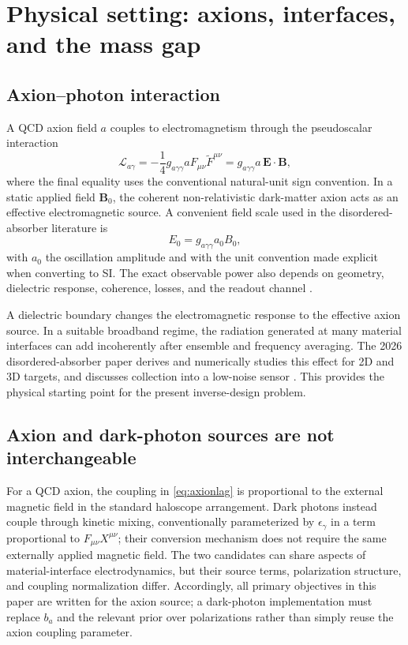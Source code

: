 \documentclass[10.5pt,a4paper]{article}
\newcommand{\Efield}{\mathbf E}
\newcommand{\Bfield}{\mathbf B}
\begin{document}
\section{Physical setting: axions, interfaces, and the mass gap}
\subsection{Axion--photon interaction}
A QCD axion field $a$ couples to electromagnetism through the pseudoscalar interaction
\begin{equation}
\mathcal L_{a\gamma}= -\frac{1}{4}g_{a\gamma\gamma}a F_{\mu\nu}\widetilde F^{\mu\nu}
= g_{a\gamma\gamma}a\,\Efield\cdot\Bfield,
\label{eq:axionlag}
\end{equation}
where the final equality uses the conventional natural-unit sign convention. In a static applied field $\Bfield_0$, the coherent non-relativistic dark-matter axion acts as an effective electromagnetic source. A convenient field scale used in the disordered-absorber literature is
\begin{equation}
E_0 = g_{a\gamma\gamma} a_0 B_0,
\label{eq:e0}
\end{equation}
with $a_0$ the oscillation amplitude and with the unit convention made explicit when converting to SI. The exact observable power also depends on geometry, dielectric response, coherence, losses, and the readout channel \parencite{Koppell2026,Baryakhtar2018}.

A dielectric boundary changes the electromagnetic response to the effective axion source. In a suitable broadband regime, the radiation generated at many material interfaces can add incoherently after ensemble and frequency averaging. The 2026 disordered-absorber paper derives and numerically studies this effect for 2D and 3D targets, and discusses collection into a low-noise sensor \parencite{Koppell2026}. This provides the physical starting point for the present inverse-design problem.

\subsection{Axion and dark-photon sources are not interchangeable}
For a QCD axion, the coupling in \cref{eq:axionlag} is proportional to the external magnetic field in the standard haloscope arrangement. Dark photons instead couple through kinetic mixing, conventionally parameterized by $\epsilon_\gamma$ in a term proportional to $F_{\mu\nu}X^{\mu\nu}$; their conversion mechanism does not require the same externally applied magnetic field. The two candidates can share aspects of material-interface electrodynamics, but their source terms, polarization structure, and coupling normalization differ. Accordingly, all primary objectives in this paper are written for the axion source; a dark-photon implementation must replace $b_a$ and the relevant prior over polarizations rather than simply reuse the axion coupling parameter.
\end{document}
